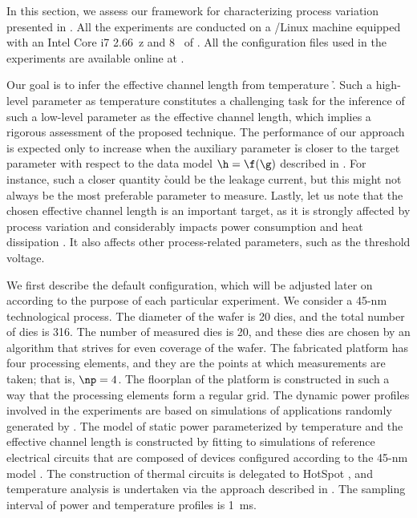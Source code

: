 In this section, we assess our framework for characterizing process variation
presented in . All the experiments are conducted on a
/Linux machine equipped with an Intel Core i7 2.66~z and
8~ of . All the configuration files used in the experiments are
available online at \cite{eslab2014a}.

Our goal is to infer the effective channel length \g from temperature \h. Such a
high-level parameter as temperature constitutes a challenging task for the
inference of such a low-level parameter as the effective channel length, which
implies a rigorous assessment of the proposed technique. The performance of our
approach is expected only to increase when the auxiliary parameter \h is closer
to the target parameter \g with respect to the data model $\h = \f(\g)$
described in . For instance, such a closer quantity \h
could be the leakage current, but this might not always be the most preferable
parameter to measure. Lastly, let us note that the chosen effective channel
length is an important target, as it is strongly affected by process variation
and considerably impacts power consumption and heat dissipation
\cite{chandrakasan2000, srivastava2010, juan2011, juan2012}. It also affects
other process-related parameters, such as the threshold voltage.

We first describe the default configuration, which will be adjusted later on
according to the purpose of each particular experiment. We consider a 45-nm
technological process. The diameter of the wafer is 20 dies, and the total
number of dies \nd is 316. The number of measured dies \hnd is 20, and these
dies are chosen by an algorithm that strives for even coverage of the wafer. The
fabricated platform has four processing elements, and they are the points at
which measurements are taken; that is, $\np = 4$. The floorplan of the platform
is constructed in such a way that the processing elements form a regular grid.
The dynamic power profiles involved in the experiments are based on simulations
of applications randomly generated by  \cite{dick1998}. The model of
static power parameterized by temperature and the effective channel length is
constructed by fitting to  simulations of reference electrical
circuits that are composed of  devices \cite{bsim} configured
according to the 45-nm   model \cite{ptm}. The construction of
thermal  circuits is delegated to HotSpot \cite{skadron2003}, and
temperature analysis is undertaken via the approach described in
. The sampling interval of power and temperature
profiles is 1~ms.

